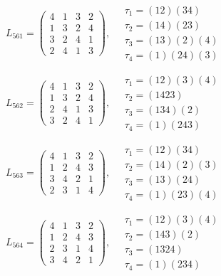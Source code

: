 $L_{561} = \begin{pmatrix} 4 & 1 & 3 & 2 \\ 1 & 3 & 2 & 4 \\ 3 & 2 & 4 & 1 \\ 2 & 4 & 1 & 3 \end{pmatrix}, \quad \begin{matrix} \tau_{1} = (1 2)(3 4) \\ \tau_{2} = (1 4)(2 3) \\ \tau_{3} = (1 3)(2)(4) \\ \tau_{4} = (1)(2 4)(3) \end{matrix}$

$L_{562} = \begin{pmatrix} 4 & 1 & 3 & 2 \\ 1 & 3 & 2 & 4 \\ 2 & 4 & 1 & 3 \\ 3 & 2 & 4 & 1 \end{pmatrix}, \quad \begin{matrix} \tau_{1} = (1 2)(3)(4) \\ \tau_{2} = (1 4 2 3) \\ \tau_{3} = (1 3 4)(2) \\ \tau_{4} = (1)(2 4 3) \end{matrix}$

$L_{563} = \begin{pmatrix} 4 & 1 & 3 & 2 \\ 1 & 2 & 4 & 3 \\ 3 & 4 & 2 & 1 \\ 2 & 3 & 1 & 4 \end{pmatrix}, \quad \begin{matrix} \tau_{1} = (1 2)(3 4) \\ \tau_{2} = (1 4)(2)(3) \\ \tau_{3} = (1 3)(2 4) \\ \tau_{4} = (1)(2 3)(4) \end{matrix}$

$L_{564} = \begin{pmatrix} 4 & 1 & 3 & 2 \\ 1 & 2 & 4 & 3 \\ 2 & 3 & 1 & 4 \\ 3 & 4 & 2 & 1 \end{pmatrix}, \quad \begin{matrix} \tau_{1} = (1 2)(3)(4) \\ \tau_{2} = (1 4 3)(2) \\ \tau_{3} = (1 3 2 4) \\ \tau_{4} = (1)(2 3 4) \end{matrix}$

